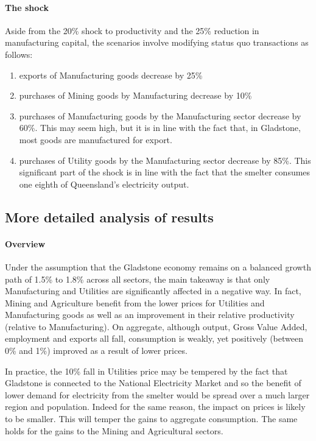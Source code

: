 \documentclass[12pt,a4paper]{article}
\begin{document}
\paragraph{The shock}
Aside from the
{\color{red} 20\%} shock to productivity and the {\color{red}25\%} reduction in
manufacturing capital, the scenarios involve modifying status quo transactions
as follows:
\begin{enumerate}
    
  \item exports of Manufacturing goods decrease by {\color{red}25\%}
    
  \item purchases of Mining goods by Manufacturing decrease by {\color{red}
    10\%}

  \item purchases of Manufacturing goods by the Manufacturing sector decrease
    by {\color{red} 60\%}. This may seem high, but it is in line with the fact
    that, in Gladstone, most goods are manufactured for export.

  \item purchases of Utility goods by the Manufacturing sector decrease by
    {\color{red}85\%}. This significant part of the shock is in line with the
    fact that the smelter consumes one eighth of Queensland's electricity
    output.
    
\end{enumerate}

\subsection*{More detailed analysis of results}

\paragraph{Overview} Under the assumption that the Gladstone economy remains on
a balanced growth path of 1.5\% to 1.8\% across all sectors, the main takeaway
is that only Manufacturing and Utilities are significantly affected in a
negative way. In fact, Mining and Agriculture benefit from the lower prices for
Utilities and Manufacturing goods as well as an improvement in their relative
productivity (relative to Manufacturing). On aggregate, although output, Gross
Value Added, employment and exports all fall, consumption is weakly, yet
positively (between 0\% and 1\%) improved as a result of lower prices.

In practice, the 10\% fall in Utilities price may be tempered by the fact that
Gladstone is connected to the National Electricity Market and so the benefit of
lower demand for electricity from the smelter would be spread over a much
larger region and population. Indeed for the same reason, the impact on prices
is likely to be smaller. This will temper the gains to aggregate consumption.
The same holds for the gains to the Mining and Agricultural sectors.
\end{document}

